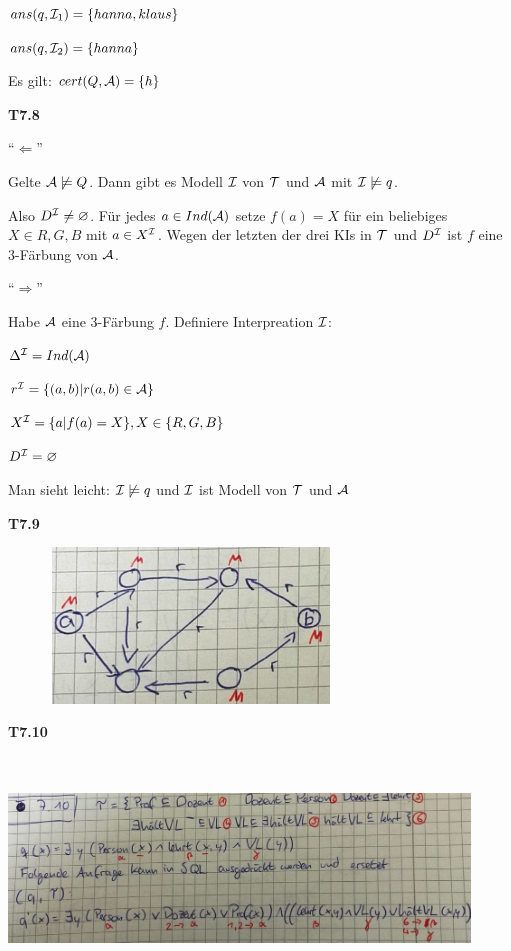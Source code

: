 $ans(q, \mathcal{I}_1) = \{hanna,klaus\}$

$ans(q, \mathcal{I}_2) = \{hanna\}$

Es gilt: $cert(Q, \mathcal{A}) = \{h\}$

\textbf{T7.8}

"`$\Leftarrow$"'

Gelte $\mathcal{A} \not\models Q$. Dann gibt es Modell $\mathcal{I}$ von $\mathcal{T}$ und $\mathcal{A}$ mit $\mathcal{I} \not\models q$.

Also $D^{\mathcal{I}} \neq \varnothing$. Für jedes $a \in Ind(\mathcal{A})$ setze $f(a) = X$ für ein beliebiges $X \in{R,G,B}$ mit $a \in X^{\mathcal{I}}$. Wegen der letzten der drei KIs in $\mathcal{T}$ und $D^{\mathcal{I}}$ ist $f$ eine 3-Färbung von $\mathcal{A}$.

"`$\Rightarrow$"'

Habe $\mathcal{A}$ eine 3-Färbung $f$. Definiere Interpreation $\mathcal{I}$:

$\Delta^{\mathcal{I}} = Ind(\mathcal{A})$

$r^{\mathcal{I}} = \{(a,b) | r(a,b) \in \mathcal{A} \}$

$X^{\mathcal{I}} = \{a | f(a) = X\}, X \in \{R,G,B\}$

$D^{\mathcal{I}} = \varnothing$

Man sieht leicht: $\mathcal{I} \not\models q$ und $\mathcal{I}$ ist Modell von $\mathcal{T}$ und $\mathcal{A}$

\textbf{T7.9}

\includegraphics[width=3.81910in,height=1.63200in]{media/79rew.png}

\textbf{T7.10}

\includegraphics[width=4.81910in,height=2.33200in]{media/710dllite.png}

